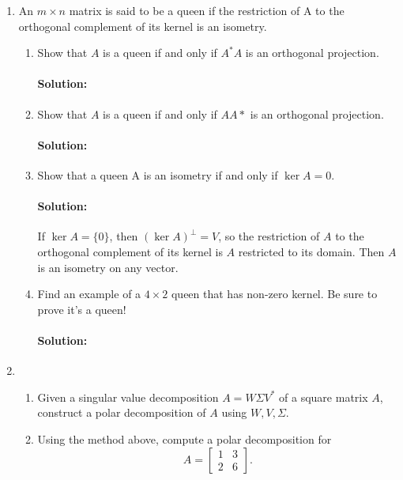 \documentclass{article}
\begin{document}
\begin{enumerate} 

\item An $m \times n$ matrix is said to be a queen if the restriction of A to the orthogonal complement of its kernel is an isometry.

\begin{enumerate}[label= (\alph*)] 
\item Show that $A$ is a queen if and only if $A^* A$ is an orthogonal projection.
    \paragraph{Solution: }

\item Show that $A$ is a queen if and only if $AA*$ is an orthogonal projection.
    \paragraph{Solution: }

\item Show that a queen A is an isometry if and only if $\ker A = {0}$.

    \paragraph{Solution: }If $\ker A=\{0\} $, then $(\ker A)^{\perp}=V$, so the restriction of $A$ to the orthogonal complement of its kernel is $A$ restricted to its domain. Then $A$ is an isometry on any vector.

\item Find an example of a $4 \times  2$ queen that has non-zero kernel. Be sure to prove it's a queen!
    \paragraph{Solution: }
\end{enumerate}
\item \begin{enumerate}[label= (\alph*)] 
\item Given a singular value decomposition $A = W \Sigma V^* $ of a square matrix $A$, construct a polar decomposition of $A$ using $W,V,\Sigma$.

\item Using the method above, compute a polar decomposition for
\[
    A=\begin{bmatrix} 1&3\\2&6 \end{bmatrix} 
.\] 
\end{enumerate}


\end{enumerate}
\end{document}
